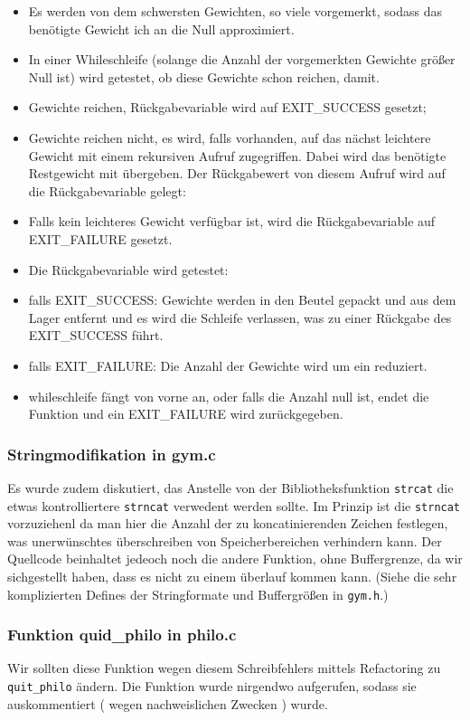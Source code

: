 \documentclass[
   draft=false
  ,paper=a4
  ,twoside=false
  ,fontsize=11pt
  ,headsepline
  ,BCOR10mm
  ,DIV11
  ,parskip=full+
]{scrartcl} %
\begin{document}
\begin{itemize}
  \item Es werden von dem schwersten Gewichten, so viele vorgemerkt, sodass das
  benötigte Gewicht ich an die Null approximiert.
  \item In einer Whileschleife (solange die Anzahl der vorgemerkten Gewichte
  größer Null ist) wird getestet, ob diese Gewichte schon reichen, damit.
  \item Gewichte reichen, Rückgabevariable wird auf EXIT\_SUCCESS gesetzt;
  \item Gewichte reichen nicht, es wird, falls vorhanden, auf das nächst
  leichtere Gewicht mit einem rekursiven Aufruf zugegriffen. Dabei wird das
  benötigte Restgewicht mit übergeben. Der Rückgabewert von diesem Aufruf wird
  auf die Rückgabevariable gelegt:
  \item Falls kein leichteres Gewicht verfügbar ist, wird die Rückgabevariable
  auf EXIT\_FAILURE gesetzt.
  \item Die Rückgabevariable wird getestet:
  \item falls EXIT\_SUCCESS: Gewichte werden in den Beutel gepackt und aus dem
  Lager entfernt und es wird die Schleife verlassen, was zu einer Rückgabe des
  EXIT\_SUCCESS führt.
  \item falls EXIT\_FAILURE: Die Anzahl der Gewichte wird um ein reduziert.
  \item whileschleife fängt von vorne an, oder falls die Anzahl null ist,
  endet die Funktion und ein EXIT\_FAILURE wird zurückgegeben.

\end{itemize}

\subsubsection*{Stringmodifikation in gym.c}
Es wurde zudem diskutiert, das Anstelle von der Bibliotheksfunktion
\texttt{strcat} die etwas kontrolliertere \texttt{strncat} verwedent werden
sollte. Im Prinzip ist die \texttt{strncat} vorzuziehenl da man hier die Anzahl
der zu koncatinierenden Zeichen festlegen, was unerwünschtes überschreiben von
Speicherbereichen verhindern kann. Der Quellcode beinhaltet jedeoch noch die
andere Funktion, ohne Buffergrenze, da wir sichgestellt haben, dass es nicht
zu einem überlauf kommen kann. (Siehe die sehr komplizierten Defines der
Stringformate und Buffergrößen in \texttt{gym.h}.)

\subsubsection{Funktion quid\_philo in philo.c}
Wir sollten diese Funktion wegen diesem Schreibfehlers mittels Refactoring
zu \texttt{quit\_philo} ändern. Die Funktion wurde nirgendwo aufgerufen, sodass
sie auskommentiert ( wegen nachweislichen Zwecken ) wurde.
\end{document}

